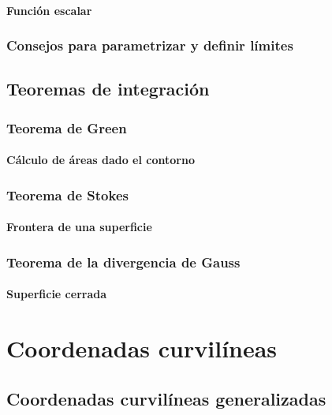 \documentclass[12pt, fleqn]{report}                             %
\theoremstyle{break}                                            %
\begin{document}
            \subsection{Función escalar}
            
        \section{Consejos para parametrizar y definir límites}
    
    \chapter{Teoremas de integración}
    
        \section{Teorema de Green}
        
            \subsection{Cálculo de áreas dado el contorno}
        
        \section{Teorema de Stokes}
        
            \subsection{Frontera de una superficie}
        
        \section{Teorema de la divergencia de Gauss}
        
            \subsection{Superficie cerrada}


\part{Coordenadas curvilíneas}

    \chapter{Coordenadas curvilíneas generalizadas}
    
\end{document}
